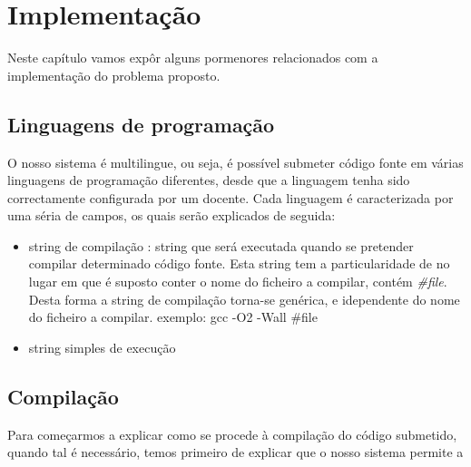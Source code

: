 \chapter{Implementação} \label{chap implem}

Neste capítulo vamos expôr alguns pormenores relacionados com a implementação do problema proposto.

\section{Linguagens de programação}\label{sec lps}
O nosso sistema é multilingue, ou seja, é possível submeter código fonte em várias linguagens de programação diferentes, desde que 
a linguagem tenha sido correctamente configurada por um docente.
Cada linguagem é caracterizada por uma séria de campos, os quais serão explicados de seguida:
\begin{itemize}
\item string de compilação : string que será executada quando se pretender compilar determinado código fonte. Esta string tem a
particularidade de no lugar em que é suposto conter o nome do ficheiro a compilar, contém \textit{\#{file}}.\\
Desta forma a string de compilação torna-se genérica, e idependente do nome do ficheiro a compilar.
exemplo: gcc -O2 -Wall \#{file}

\item string simples de execução

\end{itemize}


\section{Compilação}\label{sec comp}

Para começarmos a explicar como se procede à compilação do código submetido, quando tal é necessário, temos primeiro de explicar que o
nosso sistema permite a 
